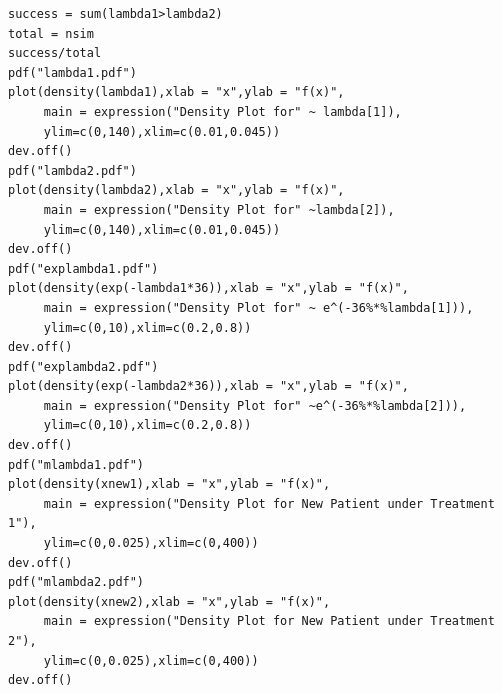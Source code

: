 \documentclass[12pt, leqno]{article}
\begin{document}
\begin{verbatim}
success = sum(lambda1>lambda2)
total = nsim
success/total
pdf("lambda1.pdf")
plot(density(lambda1),xlab = "x",ylab = "f(x)",
     main = expression("Density Plot for" ~ lambda[1]),
     ylim=c(0,140),xlim=c(0.01,0.045))
dev.off()
pdf("lambda2.pdf")
plot(density(lambda2),xlab = "x",ylab = "f(x)",
     main = expression("Density Plot for" ~lambda[2]),
     ylim=c(0,140),xlim=c(0.01,0.045))
dev.off()
pdf("explambda1.pdf")
plot(density(exp(-lambda1*36)),xlab = "x",ylab = "f(x)",
     main = expression("Density Plot for" ~ e^(-36%*%lambda[1])),
     ylim=c(0,10),xlim=c(0.2,0.8))
dev.off()
pdf("explambda2.pdf")
plot(density(exp(-lambda2*36)),xlab = "x",ylab = "f(x)",
     main = expression("Density Plot for" ~e^(-36%*%lambda[2])),
     ylim=c(0,10),xlim=c(0.2,0.8))
dev.off()
pdf("mlambda1.pdf")
plot(density(xnew1),xlab = "x",ylab = "f(x)",
     main = expression("Density Plot for New Patient under Treatment 1"),
     ylim=c(0,0.025),xlim=c(0,400))
dev.off()
pdf("mlambda2.pdf")
plot(density(xnew2),xlab = "x",ylab = "f(x)",
     main = expression("Density Plot for New Patient under Treatment 2"),
     ylim=c(0,0.025),xlim=c(0,400))
dev.off()


\end{verbatim}
\end{document}
